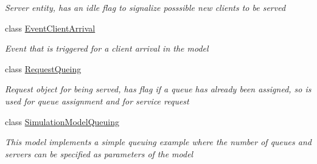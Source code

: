 \begin{DoxyCompactItemize}
\begin{DoxyCompactList}\small\item\em Server entity, has an idle flag to signalize posssible new clients to be served \end{DoxyCompactList}\item 
class \hyperlink{class_simple_queue_example_1_1_model_elements_1_1_event_client_arrival}{Event\+Client\+Arrival}
\begin{DoxyCompactList}\small\item\em Event that is triggered for a client arrival in the model \end{DoxyCompactList}\item 
class \hyperlink{class_simple_queue_example_1_1_model_elements_1_1_request_queing}{Request\+Queing}
\begin{DoxyCompactList}\small\item\em Request object for being served, has flag if a queue has already been assigned, so is used for queue assignment and for service request \end{DoxyCompactList}\item 
class \hyperlink{class_simple_queue_example_1_1_model_elements_1_1_simulation_model_queuing}{Simulation\+Model\+Queuing}
\begin{DoxyCompactList}\small\item\em This model implements a simple queuing example where the number of queues and servers can be specified as parameters of the model \end{DoxyCompactList}\end{DoxyCompactItemize}
